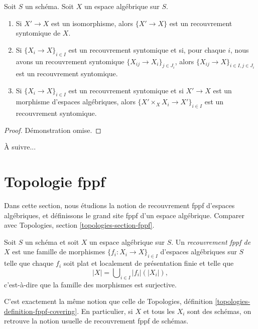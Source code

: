 \begin{lemma}
\label{lemma-syntomic}
Soit $S$ un schéma.
Soit $X$ un espace algébrique sur $S$.
\begin{enumerate}
\item Si $X' \to X$ est un isomorphisme, alors $\{X' \to X\}$
est un recouvrement syntomique de $X$.
\item Si $\{X_i \to X\}_{i\in I}$ est un recouvrement syntomique et si, pour chaque
$i$, nous avons un recouvrement syntomique $\{X_{ij} \to X_i\}_{j\in J_i}$, alors
$\{X_{ij} \to X\}_{i \in I, j\in J_i}$ est un recouvrement syntomique.
\item Si $\{X_i \to X\}_{i\in I}$ est un recouvrement syntomique
et si $X' \to X$ est un morphisme d'espaces algébriques, alors
$\{X' \times_X X_i \to X'\}_{i\in I}$ est un recouvrement syntomique.
\end{enumerate}
\end{lemma}

\begin{proof}
Démonstration omise.
\end{proof}

\noindent
À suivre...










\section{Topologie fppf}
\label{section-fppf}

\noindent
Dans cette section, nous étudions la notion de recouvrement fppf d'espaces algébriques,
et définissons le grand site fppf d'un espace algébrique. Comparer avec
Topologies, section \ref{topologies-section-fppf}.

\begin{definition}
\label{definition-fppf-covering}
Soit $S$ un schéma et soit $X$ un espace algébrique sur $S$.
Un {\it recouvrement fppf de $X$} est une famille de morphismes
$\{f_i : X_i \to X\}_{i \in I}$ d'espaces algébriques sur $S$
telle que chaque $f_i$ soit plat et localement de présentation finie
et telle que
$$
|X| = \bigcup\nolimits_{i \in I} |f_i|(|X_i|),
$$
c'est-à-dire que la famille des morphismes est surjective.
\end{definition}

\noindent
C'est exactement la même notion que celle de
Topologies, définition \ref{topologies-definition-fppf-covering}.
En particulier, si $X$ et tous les $X_i$ sont des schémas, on retrouve la notion usuelle
de recouvrement fppf de schémas.

